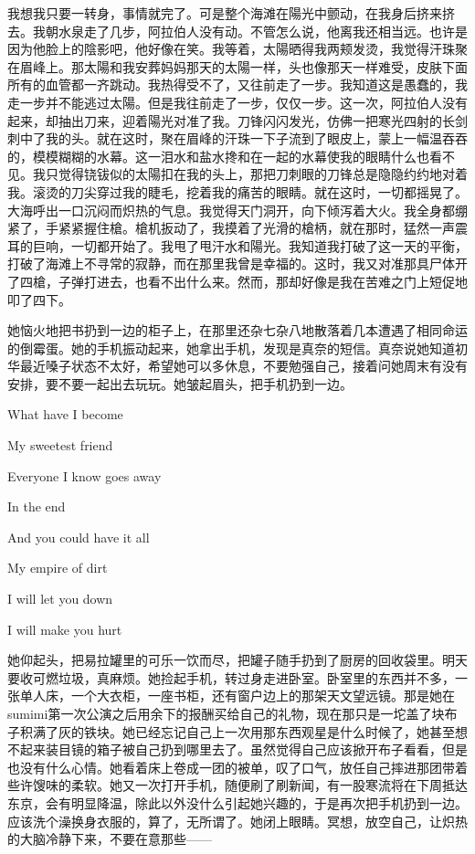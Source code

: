 \documentclass{article}
\begin{document}
我想我只要一转身，事情就完了。可是整个海滩在陽光中颤动，在我身后挤来挤去。我朝水泉走了几步，阿拉伯人没有动。不管怎么说，他离我还相当远。也许是因为他脸上的陰影吧，他好像在笑。我等着，太陽晒得我两颊发烫，我觉得汗珠聚在眉峰上。那太陽和我安葬妈妈那天的太陽一样，头也像那天一样难受，皮肤下面所有的血管都一齐跳动。我热得受不了，又往前走了一步。我知道这是愚蠢的，我走一步并不能逃过太陽。但是我往前走了一步，仅仅一步。这一次，阿拉伯人没有起来，却抽出刀来，迎着陽光对准了我。刀锋闪闪发光，仿佛一把寒光四射的长剑刺中了我的头。就在这时，聚在眉峰的汗珠一下子流到了眼皮上，蒙上一幅温吞吞的，模模糊糊的水幕。这一泪水和盐水搀和在一起的水幕使我的眼睛什么也看不见。我只觉得铙钹似的太陽扣在我的头上，那把刀刺眼的刀锋总是隐隐约约地对着我。滚烫的刀尖穿过我的睫毛，挖着我的痛苦的眼睛。就在这时，一切都摇晃了。大海呼出一口沉闷而炽热的气息。我觉得天门洞开，向下倾泻着大火。我全身都绷紧了，手紧紧握住槍。槍机扳动了，我摸着了光滑的槍柄，就在那时，猛然一声震耳的巨响，一切都开始了。我甩了甩汗水和陽光。我知道我打破了这一天的平衡，打破了海滩上不寻常的寂静，而在那里我曾是幸福的。这时，我又对准那具尸体开了四槍，子弹打进去，也看不出什么来。然而，那却好像是我在苦难之门上短促地叩了四下。



她恼火地把书扔到一边的柜子上，在那里还杂七杂八地散落着几本遭遇了相同命运的倒霉蛋。她的手机振动起来，她拿出手机，发现是真奈的短信。真奈说她知道初华最近嗓子状态不太好，希望她可以多休息，不要勉强自己，接着问她周末有没有安排，要不要一起出去玩玩。她皱起眉头，把手机扔到一边。



What have I become

My sweetest friend

Everyone I know goes away

In the end

And you could have it all

My empire of dirt

I will let you down

I will make you hurt



她仰起头，把易拉罐里的可乐一饮而尽，把罐子随手扔到了厨房的回收袋里。明天要收可燃垃圾，真麻烦。她捡起手机，转过身走进卧室。卧室里的东西并不多，一张单人床，一个大衣柜，一座书柜，还有窗户边上的那架天文望远镜。那是她在sumimi第一次公演之后用余下的报酬买给自己的礼物，现在那只是一坨盖了块布子积满了灰的铁块。她已经忘记自己上一次用那东西观星是什么时候了，她甚至想不起来装目镜的箱子被自己扔到哪里去了。虽然觉得自己应该掀开布子看看，但是也没有什么心情。她看着床上卷成一团的被单，叹了口气，放任自己摔进那团带着些许馊味的柔软。她又一次打开手机，随便刷了刷新闻，有一股寒流将在下周抵达东京，会有明显降温，除此以外没什么引起她兴趣的，于是再次把手机扔到一边。应该洗个澡换身衣服的，算了，无所谓了。她闭上眼睛。冥想，放空自己，让炽热的大脑冷静下来，不要在意那些——
\end{document}
